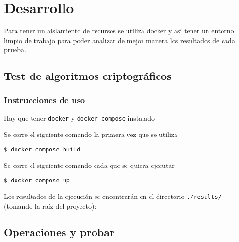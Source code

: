 \documentclass[../main.tex]{subfiles}
\begin{document}
\section{Desarrollo}\label{sec:desarrollo}

Para tener un aislamiento de recursos se utiliza \href{https://www.docker.com/}{docker} y asi tener un entorno limpio
de trabajo para poder analizar de mejor manera los resultados de cada prueba.

\subsection{Test de algoritmos criptográficos}\label{test-de-algoritmos-criptograficos}

\subsubsection{Instrucciones de uso}\label{instrucciones-de-uso}

Hay que tener \texttt{docker} y \texttt{docker-compose} instalado

Se corre el siguiente comando la primera vez que se utiliza

\begin{code}
\begin{verbatim}
$ docker-compose build
\end{verbatim}
\end{code}
Se corre el siguiente comando cada que se quiera ejecutar
\begin{code}
\begin{verbatim}
$ docker-compose up
\end{verbatim}
\end{code}
Los resultados de la ejecución se encontrarán en el directorio \texttt{./results/}
(tomando la raíz del proyecto):

\subsection{Operaciones y probar}\label{clasificaciuxf2n-de-operaciones}
\end{document}

